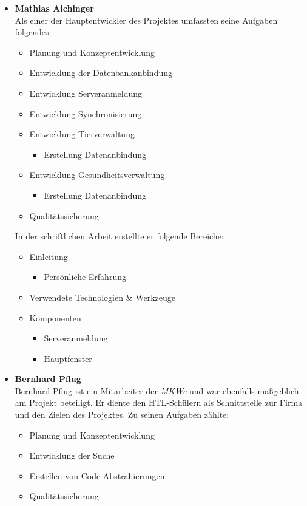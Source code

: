 \begin{itemize}
\item \textbf{Mathias Aichinger}\\
Als einer der Hauptentwickler des Projektes umfassten seine Aufgaben folgendes:
\begin{itemize}
\item Planung und Konzeptentwicklung
\item Entwicklung der Datenbankanbindung
\item Entwicklung Serveranmeldung
\item Entwicklung Synchronisierung
\item Entwicklung Tierverwaltung
\begin{itemize}
\item Erstellung Datenanbindung
\end{itemize}
\item Entwicklung Gesundheitsverwaltung
\begin{itemize}
\item Erstellung Datenanbindung
\end{itemize}
\item Qualitätssicherung
\end{itemize}

In der schriftlichen Arbeit erstellte er folgende Bereiche:
\begin{itemize}
\item Einleitung
\begin{itemize}
\item Persönliche Erfahrung
\end{itemize}
\item Verwendete Technologien \& Werkzeuge
\item Komponenten
\begin{itemize}
\item Serveranmeldung
\item Hauptfenster
\end{itemize}
\end{itemize}
     
\item \textbf{Bernhard Pflug}\\
Bernhard Pflug ist ein Mitarbeiter der \textit{MKWe} und war ebenfalls maßgeblich am Projekt beteiligt. Er diente den HTL-Schülern als Schnittstelle zur Firma und den Zielen des Projektes. Zu seinen Aufgaben zählte:     
\begin{itemize}
\item Planung und Konzeptentwicklung
\item Entwicklung der Suche
\item Erstellen von Code-Abstrahierungen
\item Qualitätssicherung
\end{itemize}     
     

\end{itemize}
